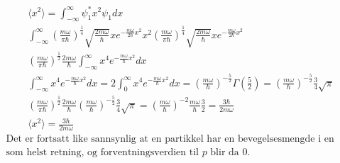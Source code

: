 \documentclass[11pt, A4paper,norsk]{article}
\begin{document}
				\begin{gather*}
\langle x^2 \rangle = \int_{- \infty}^{\infty} \psi_1^{*} x^2 \psi_1 dx \\
\int_{- \infty}^{\infty} \left( \frac{m \omega}{\pi \hbar} \right)^{\frac{1}{4}} \sqrt{\frac{2 m \omega}{\hbar}} x e^{- \frac{m \omega}{2 \hbar} x^2} x^2 \left( \frac{m \omega}{\pi \hbar} \right)^{\frac{1}{4}} \sqrt{\frac{2 m \omega}{\hbar}} x e^{- \frac{m \omega}{2 \hbar} x^2} \\
\left( \frac{m \omega}{\pi \hbar} \right)^{\frac{1}{2}} \frac{2 m \omega}{\hbar} \int_{- \infty}^{\infty} x^4 e^{- \frac{m \omega}{\hbar} x^2} dx \\
\int_{- \infty}^{\infty} x^4 e^{- \frac{m \omega}{\hbar} x^2} dx = 2 \int_{0}^{\infty} x^4 e^{- \frac{m \omega}{\hbar} x^2} dx = \left( \frac{m \omega}{\hbar} \right)^{- \frac{5}{2}} \Gamma\left( \frac{5}{2} \right) = \left( \frac{m \omega}{\hbar} \right)^{- \frac{5}{2}} \frac{3}{4} \sqrt{\pi} \\
\left( \frac{m \omega}{\pi \hbar} \right)^{\frac{1}{2}} \frac{2 m \omega}{\hbar} \left( \frac{m \omega}{\hbar} \right)^{- \frac{5}{2}} \frac{3}{4} \sqrt{\pi} = \left( \frac{m \omega}{\hbar} \right)^{-2} \frac{m \omega}{\hbar} \frac{3}{2} = \frac{3 \hbar}{2 m \omega} \\
\langle x^2 \rangle = \frac{3\hbar}{2 m \omega}
				\end{gather*}
				\begin{gather*}
\text{Det er fortsatt like sannsynlig at en partikkel har en bevegelsesmengde i en hvilken} \\
\text{som helst retning, og forventningsverdien til $p$ blir da $0$.} \\
				\end{gather*}
\end{document}
